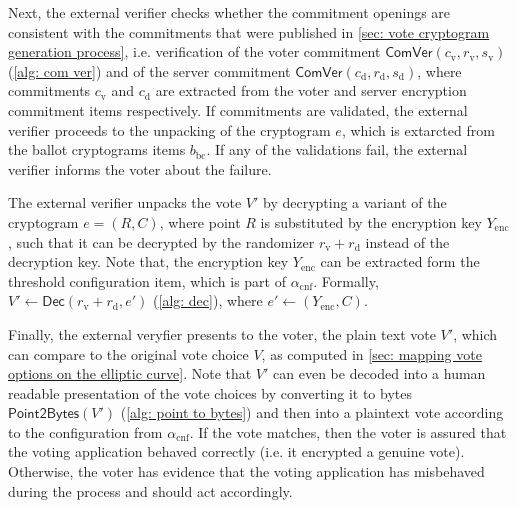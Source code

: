 Next, the external verifier checks whether the commitment openings are consistent with the commitments that were published in \cref{sec: vote cryptogram generation process}, i.e. verification of the voter commitment $\mathsf{ComVer}(c_\mathrm{v}, r_\mathrm{v}, s_\mathrm{v})$ (\cref{alg: com ver}) and of the server commitment $\mathsf{ComVer}(c_\mathrm{d}, r_\mathrm{d}, s_\mathrm{d})$, where commitments $c_\mathrm{v}$ and $c_\mathrm{d}$ are extracted from the voter and server encryption commitment items respectively. If commitments are validated, the external verifier proceeds to the unpacking of the cryptogram $e$, which is extarcted from the ballot cryptograms items $b_\mathrm{bc}$. If any of the validations fail, the external verifier informs the voter about the failure.

The external verifier unpacks the vote $V'$ by decrypting a variant of the cryptogram $e = (R, C)$, where point $R$ is substituted by the encryption key $Y_\mathrm{enc}$, such that it can be decrypted by the randomizer $r_\mathrm{v} + r_\mathrm{d}$ instead of the decryption key. Note that, the encryption key $Y_\mathrm{enc}$ can be extracted form the threshold configuration item, which is part of $\alpha_\mathrm{cnf}$. Formally, $V' \gets \mathsf{Dec}(r_\mathrm{v} + r_\mathrm{d}, e')$ (\cref{alg: dec}), where $e' \gets (Y_\mathrm{enc}, C)$.

Finally, the external veryfier presents to the voter, the plain text vote $V'$, which can compare to the original vote choice $V$, as computed in \cref{sec: mapping vote options on the elliptic curve}. Note that $V'$ can even be decoded into a human readable presentation of the vote choices by converting it to bytes $\mathsf{Point2Bytes}(V')$ (\cref{alg: point to bytes}) and then into a plaintext vote according to the configuration from $\alpha_\mathrm{cnf}$. If the vote matches, then the voter is assured that the voting application behaved correctly (i.e. it encrypted a genuine vote). Otherwise, the voter has evidence that the voting application has misbehaved during the process and should act accordingly.

